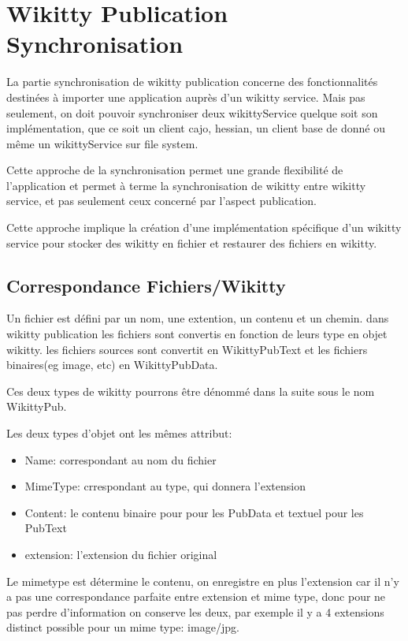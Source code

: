 \section{Wikitty Publication Synchronisation}

La partie synchronisation de wikitty publication concerne des fonctionnalités
destinées à importer une application auprès d'un wikitty service. Mais pas
seulement, on doit pouvoir synchroniser deux wikittyService quelque soit son
implémentation, que ce soit un client cajo, hessian, un client base de donné ou
même un wikittyService sur file system.

Cette approche de la synchronisation permet une grande flexibilité de
l'application et permet à terme la synchronisation de wikitty entre wikitty
service, et pas seulement ceux concerné par l'aspect publication.

Cette approche implique la création d'une implémentation spécifique d'un wikitty
service pour stocker des wikitty en fichier et restaurer des fichiers en
wikitty.


\subsection{Correspondance Fichiers/Wikitty}

Un fichier est défini par un nom, une extention, un contenu et un chemin.
dans wikitty publication les fichiers sont convertis en fonction de leurs type
en objet wikitty. les fichiers sources sont convertit en WikittyPubText et les
fichiers binaires(eg image, etc) en WikittyPubData.

Ces deux types de wikitty pourrons être dénommé dans la suite sous le nom
WikittyPub. 

Les deux types d'objet ont les mêmes attribut:
\begin{itemize}
\item Name: correspondant au nom du fichier
\item MimeType: crrespondant au type, qui donnera l'extension
\item Content: le contenu binaire pour pour les PubData et textuel pour les
PubText
\item extension: l'extension du fichier original
\end{itemize}

Le mimetype est détermine le contenu, on enregistre en plus l'extension car il
n'y a pas une correspondance parfaite entre extension et mime type, donc pour
ne pas perdre d'information on conserve les deux, par exemple il y a 4
extensions distinct possible pour un mime type: image/jpg. 

